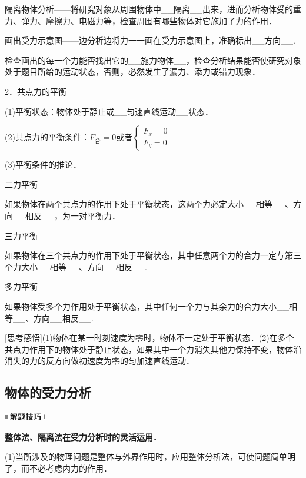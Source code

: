\documentclass[cn,10.5pt,chinese,mac,chinesefont=founder]{elegantbook}
\begin{document}
隔离物体分析------将研究对象从周围物体中\_\_隔离\_\_出来，进而分析物体受的重力、弹力、摩擦力、电磁力等，检查周围有哪些物体对它施加了力的作用．

画出受力示意图------边分析边将力一一画在受力示意图上，准确标出\_\_方向\_\_.

检查画出的每一个力能否找出它的\_\_施力物体\_\_，检查分析结果能否使研究对象处于题目所给的运动状态，否则，必然发生了漏力、添力或错力现象．

2．共点力的平衡

(1)平衡状态：物体处于静止或\_\_匀速直线运动\_\_状态．

(2)共点力的平衡条件：$F_{\text{合}}=0$或者$\left\{\begin{array}{l}F_{x}=0 \\ F_{y}=0\end{array}\right.$

(3)平衡条件的推论．

二力平衡

如果物体在两个共点力的作用下处于平衡状态，这两个力必定大小\_\_相等\_\_、方向\_\_相反\_\_，为一对平衡力．

三力平衡

如果物体在三个共点力的作用下处于平衡状态，其中任意两个力的合力一定与第三个力大小\_\_相等\_\_、方向\_\_相反\_\_.

多力平衡

如果物体受多个力作用处于平衡状态，其中任何一个力与其余力的合力大小\_\_相等\_\_、方向\_\_相反\_\_.

{[}思考感悟{]}(1)物体在某一时刻速度为零时，物体不一定处于平衡状态．(2)在多个共点力作用下的物体处于静止状态，如果其中一个力消失其他力保持不变，物体沿消失的力的反方向做初速度为零的匀加速直线运动．
\newpage
\subsection{物体的受力分析}

\begin{center}\includegraphics[width=0.70833in,height=0.125in]{media/image37.png}

\textbf{整体法、隔离法在受力分析时的灵活运用．}
\end{center}


(1)当所涉及的物理问题是整体与外界作用时，应用整体分析法，可使问题简单明了，而不必考虑内力的作用．
\end{document}
